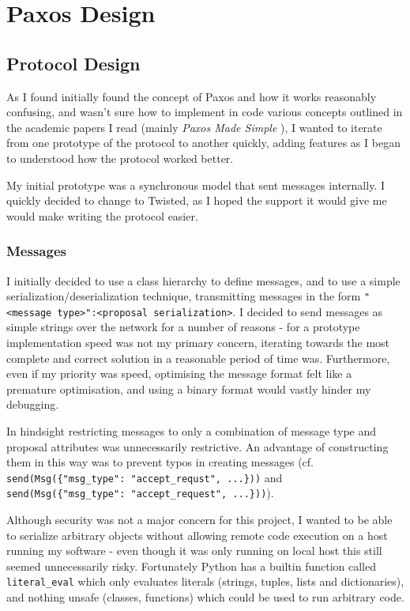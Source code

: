 \documentclass[12pt,twoside,notitlepage]{report}
\begin{document}
\section{Paxos Design}

\subsection{Protocol Design}

As I found initially found the concept of Paxos and how it works reasonably confusing, and wasn't
sure how to implement in code various concepts outlined in the academic papers I read (mainly
\emph{Paxos Made Simple} \cite{lamport01}), I wanted to iterate from one prototype of the protocol
to another quickly, adding features as I began to understood how the protocol worked better.

My initial prototype was a synchronous model that sent messages internally. I quickly decided to
change to Twisted, as I hoped the support it would give me would make writing the protocol easier.

\subsubsection*{Messages}

\label{sec:message-serialization}

I initially decided to use a class hierarchy to define messages, and to use a simple
serialization/deserialization technique, transmitting messages in the form
\verb+"<message type>":<proposal serialization>+. I decided to send messages as simple strings
over the network for a number of reasons - for a prototype implementation speed was not my primary
concern, iterating towards the most complete and correct solution in a reasonable period of time
was. Furthermore, even if my priority was speed, optimising the message format felt like a
premature optimisation, and using a binary format would vastly hinder my debugging.

In hindsight restricting messages to only a combination of message type and proposal attributes
was unnecessarily restrictive. An advantage of constructing them in this way was to prevent typos
in creating messages (cf. \verb+send(Msg({"msg_type": "accept_requst", ...}))+
and \verb+send(Msg({"msg_type": "accept_request", ...}))+).

Although security was not a major concern for this project, I wanted to be able to serialize
arbitrary objects without allowing remote code execution on a host running my software - even
though it was only running on local host this still seemed unnecessarily risky. Fortunately Python
has a builtin function called \verb+literal_eval+ which only evaluates literals (strings, tuples,
lists and dictionaries), and nothing unsafe (classes, functions) which could be used to run
arbitrary code.
\end{document}
